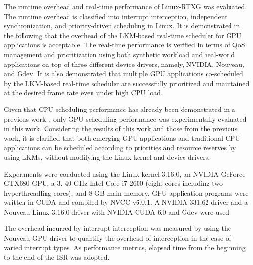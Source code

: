 \label{sec:evaluation}
The runtime overhead and real-time performance of Linux-RTXG was evaluated.
The runtime overhead is classified into interrupt interception, independent synchronization, and priority-driven scheduling in Linux.
It is demonstrated in the following that the overhead of the LKM-based real-time scheduler for GPU applications is acceptable.
The real-time performance is verified in terms of QoS management and prioritization using both synthetic workload and real-world applications on top of three different device drivers, namely, NVIDIA, Nouveau, and Gdev.
It is also demonstrated that multiple GPU applications co-scheduled by the LKM-based real-time scheduler are successfully prioritized and maintained at the desired frame rate even under high CPU load.

Given that CPU scheduling performance has already been demonstrated in a previous work~\cite{kato2009loadable}, only GPU scheduling performance was experimentally evaluated in this work.
Considering the results of this work and those from the previous work, it is clarified that both emerging GPU applications and traditional CPU applications can be scheduled according to priorities and resource reserves by using LKMs, without modifying the Linux kernel and device drivers.

Experiments were conducted using the Linux kernel 3.16.0, an NVIDIA GeForce GTX680 GPU, a 3.
40-GHz Intel Core i7 2600 (eight cores including two hyperthreadling cores), and 8-GB main memory.
GPU application programs were written in CUDA and compiled by NVCC v6.0.1. A NVIDIA 331.62 driver and a Nouveau Linux-3.16.0 driver with NVIDIA CUDA 6.0 and Gdev were used.

The overhead incurred by interrupt interception was measured by using the Nouveau GPU driver to quantify the overhead of interception in the case of varied interrupt types.
As performance metrics, elapsed time from the beginning to the end of the ISR was adopted.


